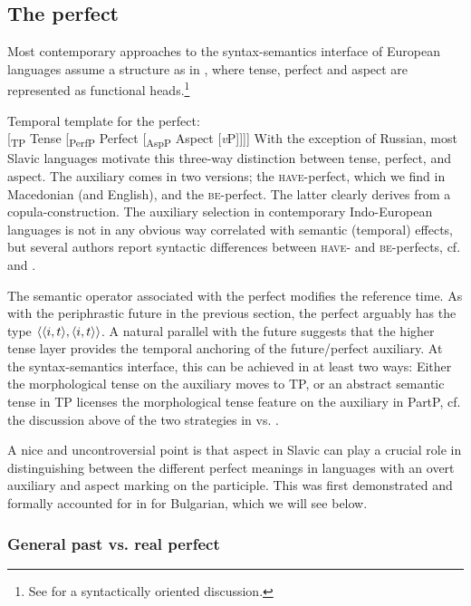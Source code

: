 \documentclass[output=paper,colorlinks,citecolor=brown]{langscibook}
\begin{document}
\subsection{The perfect}
\label{sec:3.2}

Most contemporary approaches to the syntax-semantics interface of European languages assume a
structure as in , where tense, perfect and aspect are represented as functional heads.\footnote{See \citet{todorovic16} for a  syntactically oriented discussion.}

\ea\label{ex3-arch}
Temporal template for the perfect: \\
{[}{\textsubscript{TP}} Tense [{\textsubscript{PerfP}} Perfect [{\textsubscript{AspP}} Aspect [\textit{v}P]]]]
\z
With the exception of Russian, most Slavic languages motivate this  three-way distinction between tense, perfect, and aspect. The auxiliary comes in two versions; the {\textsc{have}}-perfect, which we find in Macedonian (and English), and the {\textsc{be}}-perfect. The latter clearly derives from a copula-construction.   The auxiliary selection in contemporary Indo-European languages is not in any obvious way correlated with semantic (temporal) effects, but several authors report syntactic differences between {\textsc{have-}} and {\textsc{be-}}perfects, cf. \citet{iatridou01} and \citet{Migdalski2006}.

The semantic operator associated with the perfect modifies the reference time. As with the periphrastic future in the previous section, the perfect arguably has the type $\langle{\langle{i,t}\rangle,\langle{i,t}\rangle}\rangle$. A natural  parallel with the future suggests that the higher tense layer provides the temporal anchoring of the future/perfect auxiliary. At the syntax-semantics interface, this can be achieved in at least two ways: Either the morphological tense on the auxiliary moves to TP, or an abstract semantic tense in TP licenses the morphological tense feature on the auxiliary in PartP, cf. the discussion above of the two strategies in   vs. . 

A nice and uncontroversial point is that aspect in Slavic can play a crucial role in distinguishing between the different perfect meanings in languages with an overt auxiliary and aspect marking on the participle. This was first demonstrated and formally accounted for in \citet{pancheva03} for Bulgarian, which we will see below.

\subsubsection{General past vs. real perfect}
\end{document}
